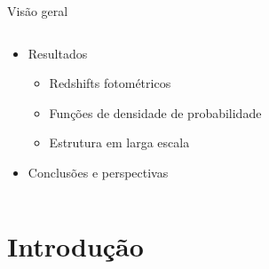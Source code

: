 \begin{frame}[c]{Visão geral}
\begin{columns}[c]
\begin{column}{0.48\linewidth}
\begin{splusbox}{}
\begin{itemize}
\begin{itemize}
                    \end{itemize}
                    \item Resultados
                    \begin{itemize}
                        \item Redshifts fotométricos
                        \item Funções de densidade de probabilidade
                        \item Estrutura em larga escala
                    \end{itemize}
                    \item Conclusões e perspectivas
                \end{itemize}
            \end{splusbox}
        \end{column}
    \end{columns}








\end{frame}

\section{Introdução}

